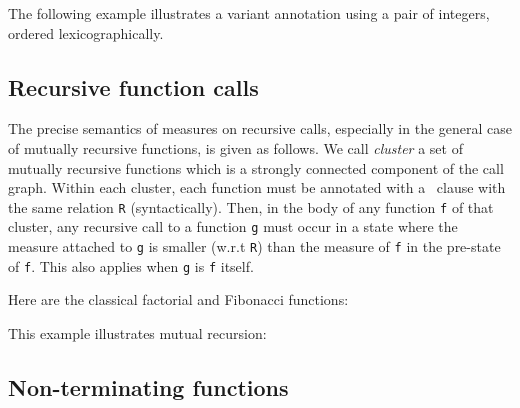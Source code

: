 \begin{example}
  The following example illustrates a variant annotation
  using a pair of integers, ordered lexicographically.
\end{example}

\subsection{Recursive function calls}

The precise semantics of measures on recursive calls, especially in
the general case of mutually recursive functions, is given as follows.
We call \emph{cluster} a set of mutually recursive functions which
is a strongly connected component of the call graph.
Within each cluster, each function must be annotated with a \decreases\
clause with the same relation \lstinline|R| (syntactically). Then, in the body
of any function \lstinline|f| of that cluster, any recursive call to a function
\lstinline|g| must occur in a state where the measure attached to
\lstinline|g| is smaller
(w.r.t \lstinline|R|) than the measure of \lstinline|f| in the pre-state of \lstinline|f|. This also
applies when \lstinline|g| is \lstinline|f| itself.

\begin{example}
  Here are the classical factorial and Fibonacci functions:
\end{example}

\begin{example}
  This example illustrates mutual recursion:
\end{example}




\subsection{Non-terminating functions}
\label{sec:non-term-funct}
\experimental

